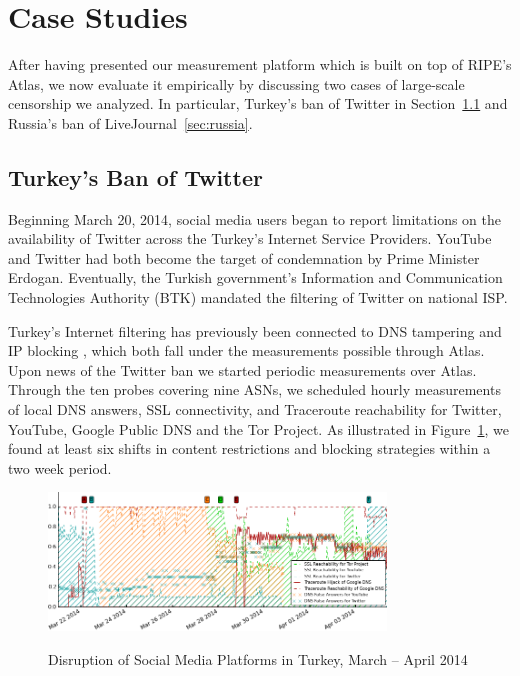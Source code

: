 \section{Case Studies}
\label{sec:case_studies}

After having presented our measurement platform which is built on top of RIPE's
Atlas, we now evaluate it empirically by discussing two cases of large-scale
censorship we analyzed.  In particular, Turkey's ban of Twitter in
Section~\ref{sec:turkey} and Russia's ban of LiveJournal~\ref{sec:russia}.


\subsection{Turkey's Ban of Twitter}
\label{sec:turkey}

Beginning March 20, 2014, social media users began to report limitations on the
availability of Twitter across the Turkey's Internet Service Providers.
YouTube and Twitter had both become the target of condemnation by Prime Minister
Erdogan.  Eventually, the Turkish government's Information
and Communication Technologies Authority (BTK) mandated the filtering of
Twitter on national ISP.

Turkey's Internet filtering has previously been connected to DNS tampering and
IP blocking \cite{akdeniz2010report}, which both fall under the measurements
possible through Atlas.  Upon news of the Twitter ban we started periodic
measurements over Atlas.  Through the ten probes covering nine ASNs, we
scheduled hourly measurements of local DNS answers, SSL connectivity, and
Traceroute reachability for Twitter, YouTube, Google Public DNS and the Tor
Project.  As illustrated in Figure~\ref{image:tr-social_media_filtering}, we
found at least six shifts in content restrictions and blocking strategies
within a two week period.

\begin{figure}
  \centering
  \includegraphics[width=0.8\textwidth]{resources/tr-20140321-20140407-social_media_filtering.png}
  \label{image:tr-social_media_filtering}
  \caption{Disruption of Social Media Platforms in Turkey, March -- April 2014}
\end{figure}



